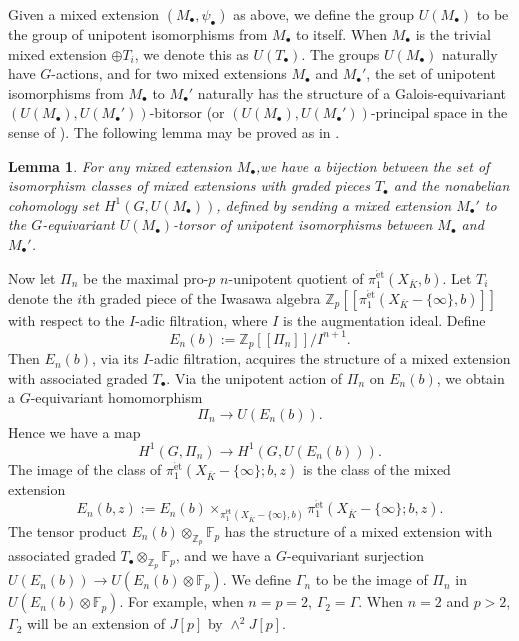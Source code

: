 \documentclass[11pt]{amsart}
\def\Z{\mathbb Z}
\def\F{\mathbb F}
\theoremstyle{plain}
\newtheorem{lemma}{Lemma}
\theoremstyle{definition}
\newcommand{\et}{\mathrm{\acute{e}t}}
\begin{document}
Given a mixed extension $(M_\bullet ,\psi _\bullet )$ as above, we define the group $U(M_\bullet )$ to be the group of unipotent isomorphisms from $M_\bullet $ to itself. When $M_\bullet $ is the trivial mixed extension $\oplus T_i$, we denote this as $U(T_\bullet )$. The groups $U(M_\bullet )$ naturally have $G$-actions, and for two mixed extensions $M_\bullet $ and $M_\bullet '$, the set of unipotent isomorphisms from $M_\bullet $ to $M_\bullet '$ naturally has the structure of a Galois-equivariant $(U(M_\bullet ),U(M_\bullet '))$-bitorsor (or $(U(M_{\bullet} ),U(M_{\bullet }'))$-principal space in the sense of \cite[I.5.35]{serre-gc}). The following lemma may be proved as in \cite[Lemma 4.7]{QC1}.
\begin{lemma}
For any mixed extension $M_\bullet $,we have a bijection between the set of isomorphism classes of mixed extensions with graded pieces $T_\bullet $ and the nonabelian cohomology set $H^1 (G,U(M_\bullet ))$, defined by sending a mixed extension $M_\bullet '$ to the $G$-equivariant $U(M_\bullet )$-torsor of unipotent isomorphisms between $M_\bullet $ and $M_\bullet '$.
\end{lemma}
Now let $\Pi _n $ be the maximal pro-$p$ $n$-unipotent quotient of $\pi _1 ^{\et }(X_{\overline{K}},b)$. Let $T_i$ denote the $i$th graded piece of the Iwasawa algebra $\Z _p [\! [\pi _1 ^{\et }(X_{\overline{K}}-\{ \infty \} ,b)]\! ]$ with respect to the $I$-adic filtration, where $I$ is the augmentation ideal. Define 
\[
E_n (b):=\Z _p [\! [\Pi _n ]\! ]/I^{n+1}.
\]
Then $E_n (b)$, via its $I$-adic filtration, acquires the structure of a mixed extension with associated graded $T_\bullet $. Via the unipotent action of $\Pi _n$ on $E_n (b)$, we obtain a $G$-equivariant homomorphism
\[
\Pi _n \to U(E_n (b)).
\]
Hence we have a map
\[
H^1 (G,\Pi _n )\to H^1 (G,U(E_n (b))).
\]
The image of the class of $\pi _1 ^{\et }(X_{\overline{K}}-\{ \infty \};b,z)$ is the class of the mixed extension
\[
E_n (b,z):=E_n (b)\times _{\pi _1 ^{\et }(X_{\overline{K}}-\{ \infty \},b)}\pi _1 ^{\et }(X_{\overline{K}}-\{ \infty \};b,z).
\]
The tensor product $E_n (b)\otimes _{\Z _p }\F _p $ has the structure of a mixed extension with associated graded $T_\bullet \otimes _{\Z _p }\F _p $, and we have a $G$-equivariant surjection $U(E_n (b))\to U(E_n (b)\otimes \F _p )$. We define $\Gamma _n $ to be the image of $\Pi _n $ in $U(E_n (b)\otimes \F _p )$. For example, when $n=p=2$, $\Gamma _2 =\Gamma $. When $n=2$ and $p>2$, $\Gamma _2 $ will be an extension of $J[p]$ by $\wedge ^2 J[p]$.
\end{document}
